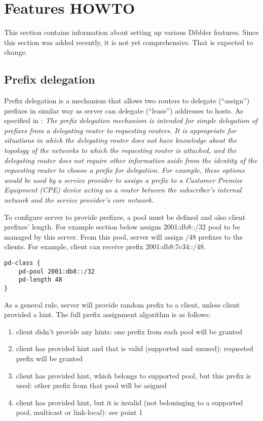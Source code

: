\newpage
\section{Features HOWTO}
This section contains information about setting up various Dibbler
features. Since this section was added recently, it is not yet
comprehensive. That is expected to change.

\subsection{Prefix delegation}
\label{feature-prefix}
Prefix delegation is a mechanism that allows two routers to delegate
(``assign'') prefixes in similar way as server can delegate
(``lease'') addresses to hosts. As specified in \cite{rfc3633}: \emph{
  The prefix delegation mechanism is intended for simple delegation of
  prefixes from a delegating router to requesting routers.  It is
  appropriate for situations in which the delegating router does not
  have knowledge about the topology of the networks to which the
  requesting router is attached, and the delegating router does not
  require other information aside from the identity of the requesting
  router to choose a prefix for delegation.  For example, these
  options would be used by a service provider to assign a prefix to a
  Customer Premise Equipment (CPE) device acting as a router between
  the subscriber's internal network and the service provider's core
  network.}

To configure server to provide prefixes, a pool must be defined and
also client prefixes' length. For example section below assigns
2001:db8::/32 pool to be managed by this server. From this pool,
server will assign /48 prefixes to the clients. For example, client
can receive prefix 2001:db8:7c34::/48.

\begin{lstlisting}
pd-class {
    pd-pool 2001:db8::/32
    pd-length 48
}
\end{lstlisting}

As a general rule, server will provide random prefix to a client,
unless client provided a hint. The full prefix assignment algorithm is
as follows:

\begin{enumerate}
\item client didn't provide any hints: one prefix from each pool will
  be granted
\item client has provided hint and that is valid (supported and
  unused): requested prefix will be granted
\item client has provided hint, which belongs to supported pool, but
  this prefix is used: other prefix from that pool will be asigned
\item client has provided hint, but it is invalid (not beloninging to
  a supported pool, multicast or link-local): see point 1
\end{enumerate}

